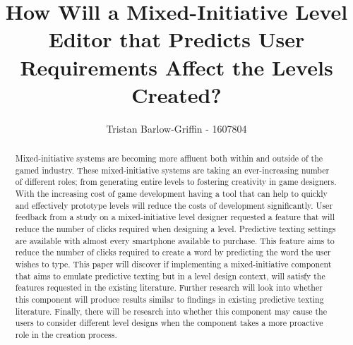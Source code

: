 \documentclass[journal]{IEEEtran}
\begin{document}
%
\title{ How Will a Mixed-Initiative Level Editor that Predicts User Requirements Affect the Levels Created?}
%
%

\author{Tristan Barlow-Griffin - 1607804}


\maketitle

\begin{abstract}
Mixed-initiative systems are becoming more affluent both within and outside of the gamed industry. These mixed-initiative systems are taking an ever-increasing number of different roles; from generating entire levels to fostering creativity in game designers. With the increasing cost of game development having a tool that can help to quickly and effectively prototype levels will reduce the costs of development significantly.
User feedback from a study on a mixed-initiative level designer requested a feature that will reduce the number of clicks required when designing a level. Predictive texting settings are available with almost every smartphone available to purchase. This feature aims to reduce the number of clicks required to create a word by predicting the word the user wishes to type.
This paper will discover if implementing a mixed-initiative component that aims to emulate predictive texting but in a level design context, will satisfy the features requested in the existing literature. Further research will look into whether this component will produce results similar to findings in existing predictive texting literature. Finally, there will be research into whether this component may cause the users to consider different level designs when the component takes a more proactive role in the creation process.

\end{abstract}
\end{document}
